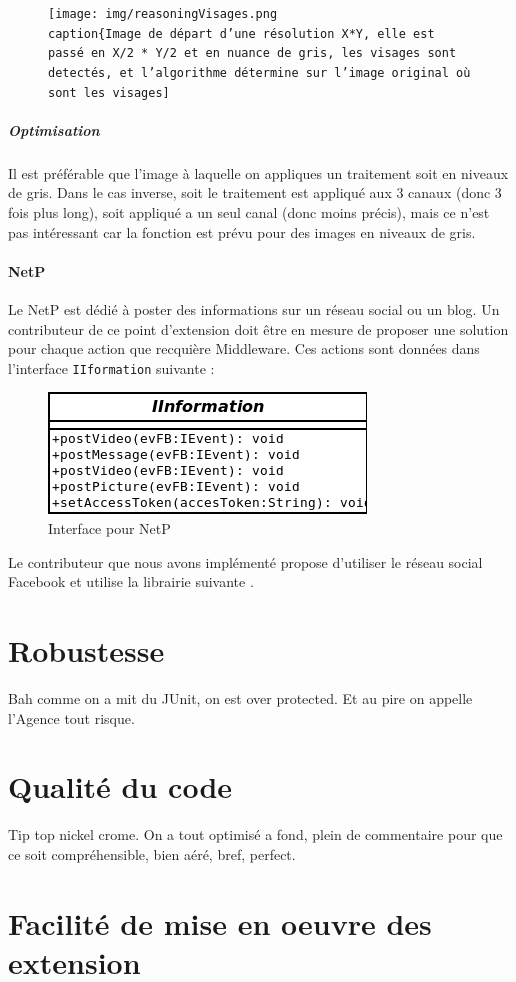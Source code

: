 				\begin{figure}[!h]
					\centering
					\texttt{[image: img/reasoningVisages.png
					\\caption\{Image de départ d'une résolution X*Y, elle est passé en X/2 * Y/2 et en nuance de gris, les visages sont detectés, et l'algorithme détermine sur l'image original où sont les visages]}
					\label{divisionRGB}
				\end{figure}
			
			\subparagraph{Optimisation}
				Il est préférable que l'image à laquelle on appliques un traitement soit en niveaux de gris. Dans le cas inverse, soit le traitement est appliqué aux 3 canaux (donc 3 fois plus long), soit appliqué a un seul canal (donc moins précis), mais ce n'est pas intéressant car la fonction est prévu pour des images en niveaux de gris.
		\paragraph{NetP}
			Le  NetP est dédié à poster des informations sur un  réseau social ou un blog. Un contributeur de ce point d'extension doit être en mesure de proposer une solution pour chaque action que recquière Middleware. Ces actions sont données dans l'interface \verb+IIformation+ suivante :
			\begin{figure}[!htbp]
				\centering
				\includegraphics[scale=0.50]{img/iinterface}
				\caption{Interface pour NetP}
				\label{fig:IInterface}
			\end{figure}

			Le contributeur que nous avons implémenté propose d'utiliser le réseau social Facebook et utilise la librairie suivante \cite{restFB}.

\section{Robustesse}
	Bah comme on a mit du JUnit, on est over protected. Et au pire on appelle l'Agence tout risque.
	
\section{Qualité du code}
	Tip top nickel crome. On a tout optimisé a fond, plein de commentaire pour que ce soit compréhensible, bien aéré, bref, perfect.
	
\section{Facilité de mise en oeuvre des extension}
	